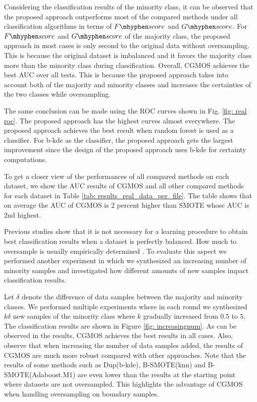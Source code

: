 \documentclass[10pt,journal,compsoc]{IEEEtran}
\newcommand\fscore{\mathop{F\mhyphen score}}
\newcommand\gscore{\mathop{G\mhyphen score}}
\begin{document}
Considering the classification results of the minority class, it can be observed that the proposed approach outperforms most of the compared methods under all classification algorithms in terms of $\fscore$ and $\gscore$. For $\fscore$ and $\gscore$ of the majority class, the proposed approach in most cases is only second to the original data without oversampling. This is because the original dataset is imbalanced and it favors the majority class more than the minority class during classification. Overall, CGMOS achieves the best AUC over all tests. This is because the proposed approach takes into account both of the majority and minority classes and increases the certainties of the two classes while oversampling.

The same conclusion can be made using the ROC curves shown in Fig. \ref{fig: real roc}. The proposed approach has the highest curves almost everywhere. The proposed approach achieves the best result when random forest is used as a classifier. For b-kde as the classifier, the proposed approach gets the largest improvement
since the design of the proposed approach uses b-kde for certainty computations.

To get a closer view of the performances of all compared methods on each dataset, we show the AUC results of CGMOS and all other compared methods for each dataset in Table \ref{tab: results_real_data_per_file}. The table shows that on average the AUC of CGMOS is 2 percent higher than SMOTE whose AUC is 2nd highest. 

Previous studies show that it is not necessary for a learning procedure to obtain best classification results when a dataset is perfectly balanced\cite{batista2004study}\cite{weiss2003learning}. How much to oversample is usually empirically determined \cite{chawla2004editorial}. To evaluate this aspect we performed another experiment in which we synthesized an increasing number of minority samples and investigated how different amounts of new samples impact classification results.

Let $\delta$ denote the difference of data samples between the majority and minority classes. We performed multiple experiments where in each round we synthesized $k\delta$ new samples of the  minority class where $k$ gradually increased from $0.5$ to $5$. The classification results are shown in Figure \ref{fig: increasingnum}. As can be observed in the results, CGMOS achieves the best results in all cases. Also, observe that when increasing the number of data samples added, the results of CGMOS are much more robust compared with other approaches. Note that the results of some methods such as Dup(b-kde), B-SMOTE(knn) and B-SMOTE(Adaboost.M1) are even lower than the results at the starting point where datasets are not oversampled. This highlights the advantage of CGMOS when handling oversampling on boundary samples. 
\end{document}
